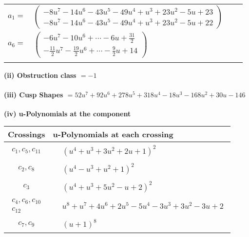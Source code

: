 \documentclass[1p]{elsarticle_modified}
\theoremstyle{definition}
\begin{document}
\begin{tabular}{m{7pt} m{180pt} m{7pt} m{180pt} }
\flushright $a_{1}=$&$\begin{pmatrix}-8 u^7-14 u^6-43 u^5-49 u^4+u^3+23 u^2-5 u+23\\-8 u^7-14 u^6-43 u^5-49 u^4+u^3+23 u^2-5 u+22\end{pmatrix}$ \\
\flushright $a_{6}=$&$\begin{pmatrix}-6 u^7-10 u^6+\cdots-6 u+\frac{31}{2}\\-\frac{11}{2} u^7-\frac{19}{2} u^6+\cdots-\frac{9}{2} u+14\end{pmatrix}$\\&\end{tabular}
\flushleft \textbf{(ii) Obstruction class $= -1$}\\~\\
\flushleft \textbf{(iii) Cusp Shapes $= 52 u^7+92 u^6+278 u^5+318 u^4-18 u^3-168 u^2+30 u-146$}\\~\\
\newpage\renewcommand{\arraystretch}{1}
\flushleft \textbf{(iv) u-Polynomials at the component}\newline \\
\begin{tabular}{m{50pt}|m{274pt}}
Crossings & \hspace{64pt}u-Polynomials at each crossing \\
\hline $$\begin{aligned}c_{1},c_{5},c_{11}\end{aligned}$$&$\begin{aligned}
&(u^4+u^3+3 u^2+2 u+1)^2
\end{aligned}$\\
\hline $$\begin{aligned}c_{2},c_{8}\end{aligned}$$&$\begin{aligned}
&(u^4- u^3+u^2+1)^2
\end{aligned}$\\
\hline $$\begin{aligned}c_{3}\end{aligned}$$&$\begin{aligned}
&(u^4+u^3+5 u^2- u+2)^2
\end{aligned}$\\
\hline $$\begin{aligned}c_{4},c_{6},c_{10}\\c_{12}\end{aligned}$$&$\begin{aligned}
&u^8+u^7+4 u^6+2 u^5-5 u^4-3 u^3+3 u^2-3 u+2
\end{aligned}$\\
\hline $$\begin{aligned}c_{7},c_{9}\end{aligned}$$&$\begin{aligned}
&(u+1)^8
\end{aligned}$\\
\hline
\end{tabular}\\~\\
\end{document}
